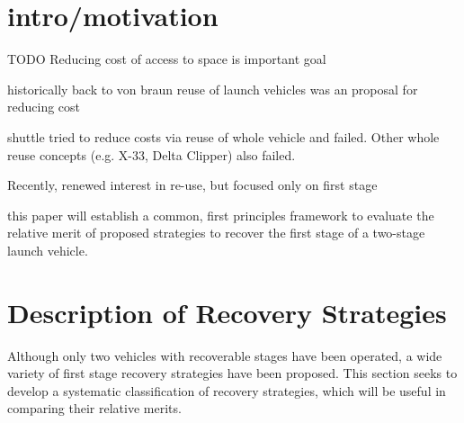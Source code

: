 \documentclass[conf]{new-aiaa}
\begin{document}
\begin{abstract}
%


\end{abstract}

\section{intro/motivation}
TODO
Reducing cost of access to space is important goal

historically back to von braun reuse of launch vehicles was an proposal for reducing cost

shuttle tried to reduce costs via reuse of whole vehicle and failed. Other whole reuse concepts (e.g. X-33, Delta Clipper) also failed.

Recently, renewed interest in re-use, but focused only on first stage

this paper will establish a common, first principles framework to evaluate the relative merit of proposed strategies to recover the first stage of a two-stage launch vehicle. 

\section{Description of Recovery Strategies}
Although only two vehicles with recoverable stages have been operated, a wide variety of first stage recovery strategies have been proposed. This section seeks to develop a systematic classification of recovery strategies, which will be useful in comparing their relative merits.
\end{document}
